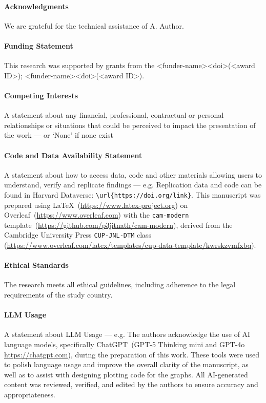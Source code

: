 \documentclass[journal=eds]{CAM-MODERN}%
\theoremstyle{definition}
\numberwithin{equation}{section}
\begin{document}
\begin{Backmatter}



\paragraph{Acknowledgments}
We are grateful for the technical assistance of A. Author.

\paragraph{Funding Statement}
This research was supported by grants from the <funder-name><doi>(<award ID>); <funder-name><doi>(<award ID>).

\paragraph{Competing Interests}
A statement about any financial, professional, contractual or personal relationships or situations that could be perceived to impact the presentation of the work --- or `None' if none exist

\paragraph{Code and Data Availability Statement}
A statement about how to access data, code and other materials allowing users to understand, verify and replicate findings --- e.g. Replication data and code can be found in Harvard Dataverse: \verb+\url{https://doi.org/link}+. %
This manuscript was prepared using \LaTeX~(\url{https://www.latex-project.org}) on Overleaf~(\url{https://www.overleaf.com}) with the \texttt{cam-modern} template~(\url{https://github.com/p3jitnath/cam-modern}), derived from the Cambridge University Press \texttt{CUP-JNL-DTM} class (\url{https://www.overleaf.com/latex/templates/cup-data-template/kwrskzvmfxbq}).

\paragraph{Ethical Standards}
The research meets all ethical guidelines, including adherence to the legal requirements of the study country.

\paragraph{LLM Usage}
A statement about LLM Usage --- e.g. The authors acknowledge the use of AI language models, specifically ChatGPT~(GPT-5 Thinking mini and GPT-4o \url{https://chatgpt.com}), during the preparation of this work. These tools were used to polish language usage and improve the overall clarity of the manuscript, as well as to assist with designing plotting code for the graphs. All AI-generated content was reviewed, verified, and edited by the authors to ensure accuracy and appropriateness.


\end{Backmatter}
\end{document}
